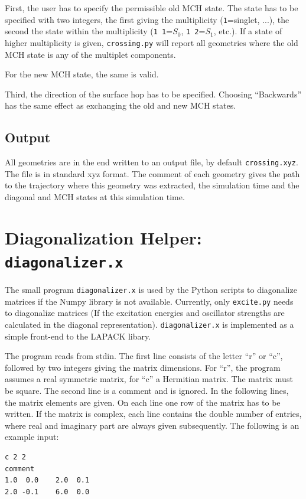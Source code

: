 \documentclass[a4paper,11pt,DIV=15,openany,twoside=false]{scrbook}
\newcommand{\ttt}[1]{\texttt{#1}}
\newenvironment{example}{
  \vspace{0mm}
  \definecolor{shadecolor}{HTML}{BBDDFF}
  \begin{shaded}
  \begin{minipage}{0.9\textwidth}
}{
  \end{minipage}
  \end{shaded}
}
\begin{document}
First, the user has to specify the permissible old MCH state. The state has to be specified with two integers, the first giving the multiplicity (\ttt{1}=singlet, ...), the second the state within the multiplicity (\ttt{1 1}=$S_0$, \ttt{1 2}=$S_1$, etc.). If a state of higher multiplicity is given, \ttt{crossing.py} will report all geometries where the old MCH state is any of the multiplet components. 

For the new MCH state, the same is valid.

Third, the direction of the surface hop has to be specified. Choosing ``Backwards'' has the same effect as exchanging the old and new MCH states. 

\subsection{Output}

All geometries are in the end written to an output file, by default \ttt{crossing.xyz}. The file is in standard xyz format. The comment of each geometry gives the path to the trajectory where this geometry was extracted, the simulation time and the diagonal and MCH states at this simulation time. 


\section{Diagonalization Helper: \ttt{diagonalizer.x}}\label{sec:diagonalizer.x}

The small program \ttt{diagonalizer.x} is used by the Python scripts to diagonalize matrices if the Numpy library is not available. Currently, only \ttt{excite.py} needs to diagonalize matrices (If the excitation energies and oscillator strengths are calculated in the diagonal representation). \ttt{diagonalizer.x} is implemented as a simple front-end to the LAPACK libary.

The program reads from stdin. The first line consists of the letter ``r'' or ``c'', followed by two integers giving the matrix dimensions. For ``r'', the program assumes a real symmetric matrix, for ``c'' a Hermitian matrix. The matrix must be square.
The second line is a comment and is ignored.
In the following lines, the matrix elements are given. On each line one row of the matrix has to be written. If the matrix is complex, each line contains the double number of entries, where real and imaginary part are always given subsequently.
The following is an example input:
\begin{example}
\footnotesize\begin{verbatim}
c 2 2
comment
1.0  0.0    2.0  0.1
2.0 -0.1    6.0  0.0
\end{verbatim}
\end{example}
\end{document}
